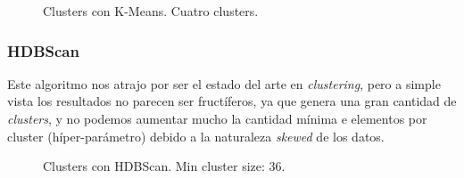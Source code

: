 \documentclass[a4paper]{article}
\begin{document}
\begin{figure}[!h]
	\caption{Clusters con K-Means. Cuatro clusters.}
	\label{fig:mesdiasnormalizado}
\end{figure}


\subsubsection{HDBScan}

Este algoritmo nos atrajo por ser el estado del arte en \textit{clustering}, pero a simple vista los resultados no parecen ser fructíferos, ya que genera una gran cantidad de \textit{clusters}, y no podemos aumentar mucho la cantidad mínima e elementos por cluster (híper-parámetro) debido a la naturaleza \textit{skewed} de los datos.

\begin{figure}[!h]
	\caption{Clusters con HDBScan. Min cluster size: 36.}
	\label{fig:mesdiasnormalizado}
\end{figure}
\end{document}
